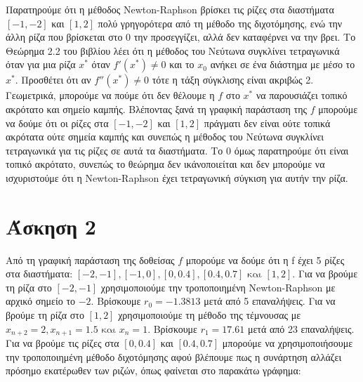 \documentclass[12pt,a4paper]{article}
\begin{document}
    Παρατηρούμε ότι η μέθοδος Newton-Raphson βρίσκει τις ρίζες στα διαστήματα $[-1,-2]$ και $[1,2]$ πολύ γρηγορότερα από τη μέθοδο της διχοτόμησης, ενώ την άλλη 
    ρίζα που βρίσκεται στο 0 την προσεγγίζει, αλλά δεν καταφέρνει να την βρει. Το Θεώρημα 2.2 του βιβλίου λέει ότι η μέθοδος του Νεύτωνα συγκλίνει τετραγωνικά 
    όταν για μια ρίζα $x^*$ όταν $f'(x^*) \neq 0$ και το $x_0$ ανήκει σε ένα διάστημα με μέσο το $x^*$. Προσθέτει ότι αν $f''(x^*) \neq 0$ τότε η τάξη σύγκλισης 
    είναι ακριβώς 2. Γεωμετρικά, μπορούμε να πούμε ότι δεν θέλουμε η $f$ στο $x^*$ να παρουσιάζει τοπικό ακρότατο και σημείο καμπής. Βλέποντας ξανά τη γραφική 
    παράσταση της $f$ μπορούμε να δούμε ότι οι ρίζες στα $[-1,-2]$ και $[1,2]$ πράγματι δεν είναι ούτε τοπικά ακρότατα ούτε σημεία καμπής και συνεπώς η μέθοδος του 
    Νεύτωνα συγκλίνει τετραγωνικά για τις ρίζες σε αυτά τα διαστήματα. Το 0 όμως παρατηρούμε ότι είναι τοπικό ακρότατο, συνεπώς το θεώρημα δεν ικάνοποιείται και 
    δεν μπορούμε να ισχυριστούμε ότι η Newton-Raphson έχει τετραγωνική σύγκιση για αυτήν την ρίζα.

    \section{Άσκηση 2}
    Από τη γραφική παράσταση της δοθείσας $f$ μπορούμε να δούμε ότι η f έχει 5 ρίζες στα διαστήματα: $[-2,-1], [-1,0],[0,0.4],[0.4,0.7] \text{ και } [1,2]$.
    Για να βρούμε τη ρίζα στο $[-2,-1]$ χρησιμοποιούμε την τροποποιημένη Newton-Raphson με αρχικό σημείο το $-2$. Βρίσκουμε $r_0 = -1.3813$ μετά από 5 επαναλήψεις.
    Για να βρούμε τη ρίζα στο $[1,2]$ χρησιμοποιούμε τη μέθοδο της τέμνουσας με $x_{n+2} = 2, x_{n+1} = 1.5 \text{ και } x_n = 1$. Βρίσκουμε $r_1 = 17.61$ μετά 
    από 23 επαναλήψεις. Για να βρούμε τις ρίζες στα $[0,0.4]$ και $[0.4,0.7]$ μπορούμε να χρησιμοποιήσουμε την τροποποιημένη μέθοδο διχοτόμησης αφού βλέπουμε πως 
    η συνάρτηση αλλάζει πρόσημο εκατέρωθεν των ριζών, όπως φαίνεται στο παρακάτω γράφημα: 

    \begin{center}     
    \end{center}
\end{document}
